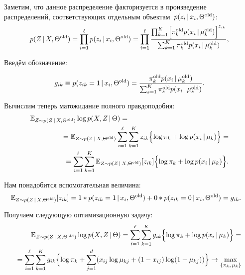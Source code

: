 \documentclass[12pt,a4paper]{article}
\begin{document}
Заметим, что данное распределение факторизуется в произведение распределений, соответствующих отдельным объектам~$p(z_i \mspace{3mu}{|}\mspace{3mu} x_i, \Theta^{\text{old}})$:
\begin{equation*}
p(Z \mspace{3mu}{|}\mspace{3mu} X, \Theta^{\text{old}}) = \prod_{i = 1}^{\ell}p(z_i \mspace{3mu}{|}\mspace{3mu} x_i, \Theta^{\text{old}}) = \prod_{i = 1}^{\ell} \frac{\prod_{k = 1}^{K} \Bigl[\pi_k^{\text{old}} p(x_i \mspace{3mu}{|}\mspace{3mu} \mu_k^{\text{old}}) \Bigr]^{z_{ik}}}{\sum_{k=1}^K \pi_k^{\text{old}} p(x_i \mspace{3mu}{|}\mspace{3mu} \mu_k^{\text{old}})},
\end{equation*}

Введём обозначение:

\begin{align*}
g_{ik} \equiv p(z_{ik} = 1 \mspace{3mu}{|}\mspace{3mu} x_i, \Theta^{\text{old}}) = \frac{\pi_k^{\text{old}} p(x_i \mspace{3mu}{|}\mspace{3mu} \mu_k^{\text{old}})}{\sum_{s = 1}^{K}\pi_s^{\text{old}} p(x_i \mspace{3mu}{|}\mspace{3mu} \mu_s^{\text{old}})}.
\end{align*}

Вычислим теперь матожидание полного правдоподобия:
\begin{align*}
	\mathbb{E}_{Z \sim p(Z \cond X, \Theta^{\text{old}})} \log p(X, Z \cond \Theta) = \phantom{\hspace{5cm}}\\
= \mathbb{E}_{Z \sim p(Z \cond X, \Theta^{\text{old}})} \sum_{i = 1}^{\ell} \sum_{k = 1}^{K} z_{ik}
    \Bigl\{
        \log \pi_k
        +
        \log p(x_i \cond \mu_k)
    \Bigr\}
=\\
=
\sum_{i = 1}^{\ell}
\sum_{k = 1}^{K}
    \mathbb{E}_{Z \sim p(Z \cond X, \Theta^{\text{old}})}
        [z_{ik}]
    \Bigl\{
        \log \pi_k
        +
        \log p(x_i \cond \mu_k)
    \Bigr\}.
\end{align*}

Нам понадобится вспомогательная величина:
\begin{align*}
\mathbb{E}_{Z \sim p(Z \mspace{3mu}{|}\mspace{3mu} X, \Theta^{\text{old}})}[z_{ik}] &= 1 * p(z_{ik} = 1 \mspace{3mu}{|}\mspace{3mu} x_i, \Theta^{\text{old}}) + 0 * p(z_{ik} = 0 \mspace{3mu}{|}\mspace{3mu} x_i, \Theta^{\text{old}}) = g_{ik}.
\end{align*}

Получаем следующую оптимизационную задачу:
\begin{align*}
\mathbb{E}_{Z \sim p(Z \mspace{3mu}{|}\mspace{3mu} X, \Theta^{\text{old}})} \log p(X, Z \mspace{3mu}{|}\mspace{3mu} \Theta)   =
\sum_{i = 1}^{\ell} \sum_{k = 1}^{K} g_{ik} \Bigl\{ \log \pi_k + \log p(x_i \mspace{3mu}{|}\mspace{3mu} \mu_k)\Bigr\} =\\
= \sum_{i = 1}^{\ell} \sum_{k = 1}^{K} g_{ik} \Bigl\{ \log \pi_k + \sum_{j=1}^d (x_{ij}\log \mu_{kj} + (1-x_{ij})\log (1-\mu_{kj})) \Bigr\} \to \max_{\{\pi_k, \, \mu_k\}}
\end{align*}
\end{document}
